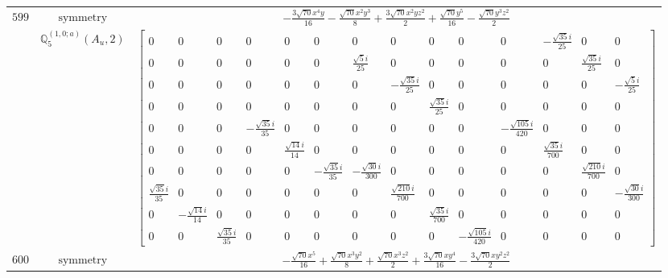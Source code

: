 \documentclass[fleqn,8pt,landscape]{jsarticle}
\begin{document}
\begin{longtable}{ccc}
$ 599 $ & $ \text{symmetry} $ & $ - \frac{3 \sqrt{70} x^{4} y}{16} - \frac{\sqrt{70} x^{2} y^{3}}{8} + \frac{3 \sqrt{70} x^{2} y z^{2}}{2} + \frac{\sqrt{70} y^{5}}{16} - \frac{\sqrt{70} y^{3} z^{2}}{2} $ \\
$  $ & $ \mathbb{Q}_{5}^{(1,0;a)}(A_{u},2) $ & $ \begin{bmatrix} 0 & 0 & 0 & 0 & 0 & 0 & 0 & 0 & 0 & 0 & 0 & - \frac{\sqrt{35} i}{25} & 0 & 0 \\ 0 & 0 & 0 & 0 & 0 & 0 & \frac{\sqrt{5} i}{25} & 0 & 0 & 0 & 0 & 0 & \frac{\sqrt{35} i}{25} & 0 \\ 0 & 0 & 0 & 0 & 0 & 0 & 0 & - \frac{\sqrt{35} i}{25} & 0 & 0 & 0 & 0 & 0 & - \frac{\sqrt{5} i}{25} \\ 0 & 0 & 0 & 0 & 0 & 0 & 0 & 0 & \frac{\sqrt{35} i}{25} & 0 & 0 & 0 & 0 & 0 \\ 0 & 0 & 0 & - \frac{\sqrt{35} i}{35} & 0 & 0 & 0 & 0 & 0 & 0 & - \frac{\sqrt{105} i}{420} & 0 & 0 & 0 \\ 0 & 0 & 0 & 0 & \frac{\sqrt{14} i}{14} & 0 & 0 & 0 & 0 & 0 & 0 & \frac{\sqrt{35} i}{700} & 0 & 0 \\ 0 & 0 & 0 & 0 & 0 & - \frac{\sqrt{35} i}{35} & - \frac{\sqrt{30} i}{300} & 0 & 0 & 0 & 0 & 0 & \frac{\sqrt{210} i}{700} & 0 \\ \frac{\sqrt{35} i}{35} & 0 & 0 & 0 & 0 & 0 & 0 & \frac{\sqrt{210} i}{700} & 0 & 0 & 0 & 0 & 0 & - \frac{\sqrt{30} i}{300} \\ 0 & - \frac{\sqrt{14} i}{14} & 0 & 0 & 0 & 0 & 0 & 0 & \frac{\sqrt{35} i}{700} & 0 & 0 & 0 & 0 & 0 \\ 0 & 0 & \frac{\sqrt{35} i}{35} & 0 & 0 & 0 & 0 & 0 & 0 & - \frac{\sqrt{105} i}{420} & 0 & 0 & 0 & 0 \end{bmatrix} $ \\ \hline
$ 600 $ & $ \text{symmetry} $ & $ - \frac{\sqrt{70} x^{5}}{16} + \frac{\sqrt{70} x^{3} y^{2}}{8} + \frac{\sqrt{70} x^{3} z^{2}}{2} + \frac{3 \sqrt{70} x y^{4}}{16} - \frac{3 \sqrt{70} x y^{2} z^{2}}{2} $ \\

\end{longtable}
\end{document}
